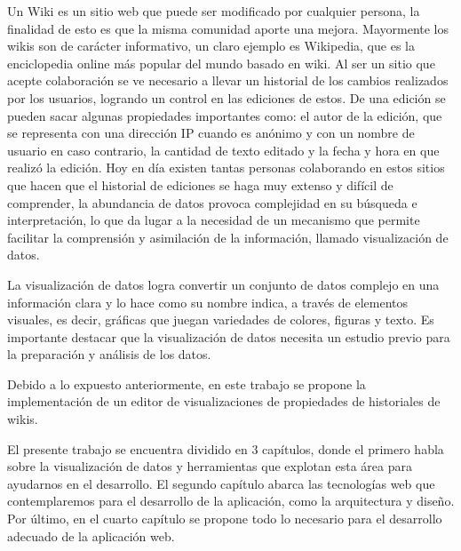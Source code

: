 Un Wiki es un sitio web que puede ser modificado por cualquier persona, la finalidad de esto es que la misma comunidad aporte una mejora. Mayormente los wikis son de carácter informativo, un claro ejemplo es Wikipedia, que es la enciclopedia online más popular del mundo basado en wiki. Al ser un sitio que acepte colaboración se ve necesario a llevar un historial de los cambios realizados por los usuarios, logrando un control en las ediciones de estos. De una edición se pueden sacar algunas propiedades importantes como: el autor de la edición, que se representa con una dirección IP cuando es anónimo y con un nombre de usuario en caso contrario, la cantidad de texto editado y la fecha y hora en que realizó la edición. Hoy en día existen tantas personas colaborando en estos sitios que hacen que el historial de ediciones se haga muy extenso y difícil de comprender, la abundancia de datos provoca complejidad en su búsqueda e interpretación, lo que da lugar a la necesidad de un mecanismo que permite facilitar la comprensión y asimilación de la información, llamado visualización de datos.

La visualización de datos logra convertir un conjunto de datos complejo en una información clara y lo hace como su nombre indica, a través de elementos visuales, es decir, gráficas que juegan variedades de colores, figuras y texto. Es importante destacar que la visualización de datos necesita un estudio previo para la preparación y análisis de los datos.

Debido a lo expuesto anteriormente, en este trabajo se propone la implementación de un editor de visualizaciones de propiedades de historiales de wikis.

El presente trabajo se encuentra dividido en 3 capítulos, donde el primero habla sobre la visualización de datos y herramientas que explotan esta área para ayudarnos en el desarrollo. El segundo capítulo abarca las tecnologías web que contemplaremos para el desarrollo de la aplicación, como la arquitectura y diseño. Por último, en el cuarto capítulo se propone todo lo necesario para el desarrollo adecuado de la aplicación web.
